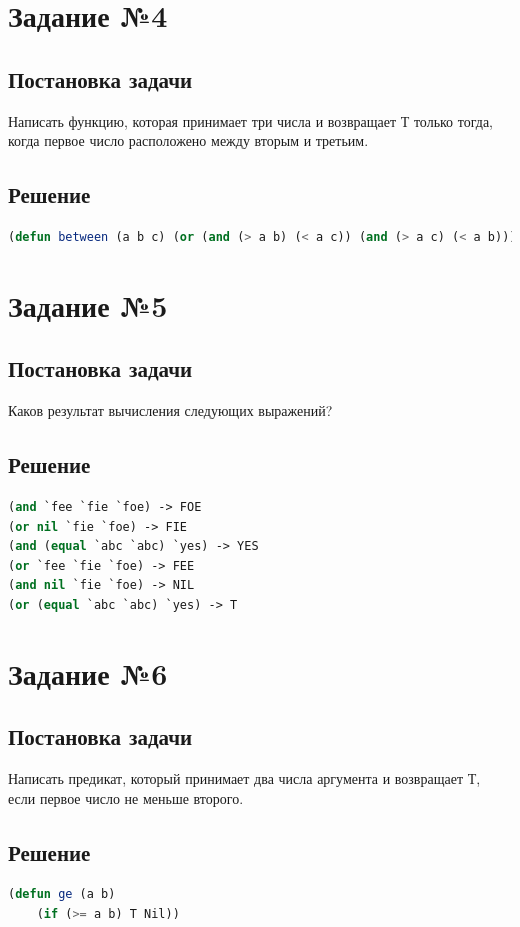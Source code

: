 \documentclass[12pt]{report}
\begin{document}
\section*{Задание №4}
\subsection*{Постановка задачи}
Написать функцию, которая принимает три числа и возвращает Т только тогда, когда первое число расположено между вторым и третьим.

\subsection*{Решение}
\begin{lstlisting}[label=4,caption=Решение задания №4, language=lisp]
	(defun between (a b c) (or (and (> a b) (< a c)) (and (> a c) (< a b))))
\end{lstlisting}

\section*{Задание №5}
\subsection*{Постановка задачи}
Каков результат вычисления следующих выражений?

\subsection*{Решение}
\begin{lstlisting}[label=5,caption=Решение задания №5, language=lisp]
(and `fee `fie `foe) -> FOE
(or nil `fie `foe) -> FIE
(and (equal `abc `abc) `yes) -> YES
(or `fee `fie `foe) -> FEE
(and nil `fie `foe) -> NIL
(or (equal `abc `abc) `yes) -> T
\end{lstlisting}

\section*{Задание №6}
\subsection*{Постановка задачи}
Написать предикат, который принимает два числа аргумента и возвращает Т, если первое число не меньше второго.

\subsection*{Решение}
\begin{lstlisting}[label=6,caption=Решение задания №6, language=lisp]
(defun ge (a b)
	(if (>= a b) T Nil))
\end{lstlisting}
\end{document}
